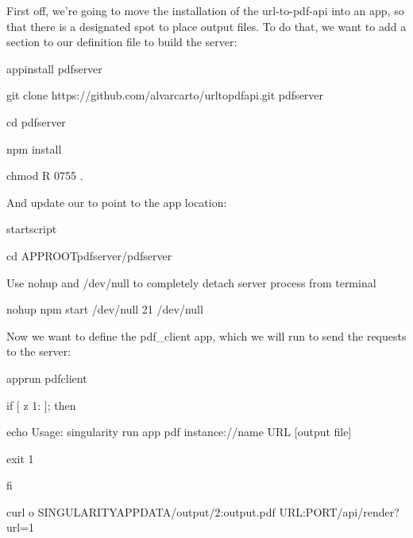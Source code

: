 \documentclass[letterpaper,10pt,english]{sphinxmanual}
\begin{document}
First off, we’re going to move the installation of the url-to-pdf-api
into an app, so that there is a designated spot to place output files.
To do that, we want to add a section to our definition file to build
the server:

%
\begin{sphinxVerbatim}[commandchars=\\\{\}]
\PYGZpc{}appinstall pdf\PYGZus{}server

    git clone https://github.com/alvarcarto/url\PYGZhy{}to\PYGZhy{}pdf\PYGZhy{}api.git pdf\PYGZus{}server

    cd pdf\PYGZus{}server

    npm install

    chmod \PYGZhy{}R 0755 .
\end{sphinxVerbatim}

And update our  to point to the app location:

%
\begin{sphinxVerbatim}[commandchars=\\\{\}]
\PYGZpc{}startscript

    cd \PYGZdq{}\PYGZdl{}\PYGZob{}APPROOT\PYGZus{}pdf\PYGZus{}server\PYGZcb{}/pdf\PYGZus{}server\PYGZdq{}

    \PYGZsh{} Use nohup and /dev/null to completely detach server process from terminal

    nohup npm start \PYGZgt{} /dev/null 2\PYGZgt{}\PYGZam{}1 \PYGZlt{} /dev/null \PYGZam{}
\end{sphinxVerbatim}

Now we want to define the pdf\_client app, which we will run to send the
requests to the server:

%
\begin{sphinxVerbatim}[commandchars=\\\{\}]
\PYGZpc{}apprun pdf\PYGZus{}client

    if [ \PYGZhy{}z \PYGZdq{}\PYGZdl{}\PYGZob{}1:\PYGZhy{}\PYGZcb{}\PYGZdq{} ]; then

        echo \PYGZdq{}Usage: singularity run \PYGZhy{}\PYGZhy{}app pdf \PYGZlt{}instance://name\PYGZgt{} \PYGZlt{}URL\PYGZgt{} [output file]\PYGZdq{}

        exit 1

    fi

    curl \PYGZhy{}o \PYGZdq{}\PYGZdl{}\PYGZob{}SINGULARITY\PYGZus{}APPDATA\PYGZcb{}/output/\PYGZdl{}\PYGZob{}2:\PYGZhy{}output.pdf\PYGZcb{}\PYGZdq{} \PYGZdq{}\PYGZdl{}\PYGZob{}URL\PYGZcb{}:\PYGZdl{}\PYGZob{}PORT\PYGZcb{}/api/render?url=\PYGZdl{}\PYGZob{}1\PYGZcb{}\PYGZdq{}
\end{sphinxVerbatim}
\end{document}
